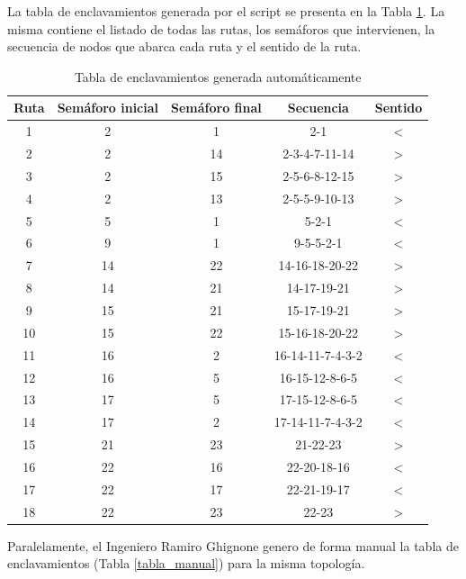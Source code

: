 	La tabla de enclavamientos generada por el script se presenta en la Tabla \ref{tabla_script}. La misma contiene el listado de todas las rutas, los semáforos que intervienen, la secuencia de nodos que abarca cada ruta y el sentido de la ruta.
	
	\begin{table}[!hbt]
	\caption{Tabla de enclavamientos generada automáticamente}
	\label{tabla_script}
	\centering
	\begin{tabular}{ c  c  c  c  c }
	\hline
	Ruta & Semáforo inicial & Semáforo final & Secuencia & Sentido \\	
	\hline
		1 & 2 & 1 & 2-1 & < \\
		2 & 2 & 14 & 2-3-4-7-11-14 & > \\
		3 & 2 & 15 & 2-5-6-8-12-15 & > \\
		4 & 2 & 13 & 2-5-5-9-10-13 & > \\
		5 & 5 & 1 & 5-2-1 & < \\
		6 & 9 & 1 & 9-5-5-2-1 & < \\
		7 & 14 & 22 & 14-16-18-20-22 & > \\
		8 & 14 & 21 & 14-17-19-21 & > \\
		9 & 15 & 21 & 15-17-19-21 & > \\
		10 & 15 & 22 & 15-16-18-20-22 & > \\
		11 & 16 & 2 & 16-14-11-7-4-3-2 & < \\
		12 & 16 & 5 & 16-15-12-8-6-5 & < \\
		13 & 17 & 5 & 17-15-12-8-6-5 & < \\
		14 & 17 & 2 & 17-14-11-7-4-3-2 & < \\
		15 & 21 & 23 & 21-22-23 & > \\
		16 & 22 & 16 & 22-20-18-16 & < \\
		17 & 22 & 17 & 22-21-19-17 & < \\
		18 & 22 & 23 & 22-23 & > \\
	\end{tabular}
	\end{table}		
	
	Paralelamente, el Ingeniero Ramiro Ghignone genero de forma manual la tabla de enclavamientos (Tabla \ref{tabla_manual}) para la misma topología.
	 
